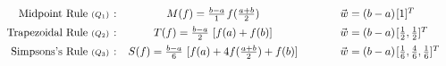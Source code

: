 \documentclass[12pt]{article}
\newcommand{\hs}{\hspace{1pt}}
\newcommand{\hsvec}[1]{\vec{\hs #1}}
\begin{document}
\(\hspace{10pt} \arraycolsep=2pt \begin{array}{r c c c l}
    \text{Midpoint Rule}\ {\scriptstyle(Q_1)}
        &:\ \
        &M(f) = \tfrac{b-a}{1}\hs f(\tfrac{a+b}{2})
        &\hspace{30pt} 
        &\hsvec{w} = (b-a)\hs [1]^T
        \\[5pt]
    \text{Trapezoidal Rule}\ {\scriptstyle(Q_2)}
        &:\ \
        &T(f) = \frac{b-a}{2}\ [f(a) + f(b)]
        &
        &\hsvec{w} = (b-a)\hs [\tfrac{1}{2}, \tfrac{1}{2}]^T
        \\[5pt]
    \text{Simpsons's Rule}\ {\scriptstyle(Q_3)}
        &:\ \
        &S(f) = \frac{b-a}{6}\ [f(a) + 4f(\tfrac{a+b}{2}) + f(b)]
        & 
        &\hsvec{w} = (b-a)\hs [\tfrac{1}{6}, \tfrac{4}{6}, \tfrac{1}{6}]^T
\end{array}\)
\end{document}
